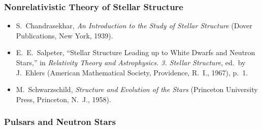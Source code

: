 \subsubsection*{Nonrelativistic Theory of Stellar Structure}

\begin{itemize}
  \item[\(\square\)] S.~Chandrasekhar, \emph{An Introduction to the Study
  of Stellar Structure} (Dover Publications, New York, 1939).

  \item[\(\square\)] E.~E.~Salpeter, ``Stellar Structure Leading up to
  White Dwarfs and Neutron Stars,'' in \emph{Relativity Theory and
  Astrophysics. 3. Stellar Structure}, ed.\ by J.~Ehlers (American
  Mathematical Society, Providence, R.~I., 1967), p.~1.

  \item[\(\square\)] M.~Schwarzschild, \emph{Structure and Evolution of
  the Stars} (Princeton University Press, Princeton, N.~J., 1958).
\end{itemize}

\subsubsection*{Pulsars and Neutron Stars}

